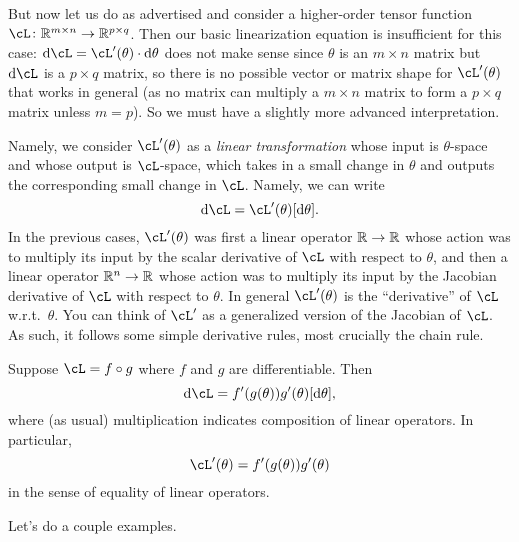 \documentclass[../../book-main.tex]{subfiles}
\begin{document}
But now let us do as advertised and consider a higher-order tensor function \(\cL \colon \R^{m \times n} \to \R^{p \times q}\). Then our basic linearization equation is insufficient for this case: \(\odif{\cL} = \cL^{\prime}(\theta) \cdot \odif{\theta}\) does not make sense since \(\theta\) is an \(m \times n\) matrix but \(\odif{\cL}\) is a \(p \times q\) matrix, so there is no possible vector or matrix shape for \(\cL^{\prime}(\theta)\) that works in general (as no matrix can multiply a \(m \times n\) matrix to form a \(p \times q\) matrix unless \(m = p\)). So we must have a slightly more advanced interpretation. 

Namely, we consider \(\cL^{\prime}(\theta)\) as a \textit{linear transformation} whose input is \(\theta\)-space and whose output is \(\cL\)-space, which takes in a small change in \(\theta\) and outputs the corresponding small change in \(\cL\). Namely, we can write 
\begin{equation}
    \odif{\cL} = \cL^{\prime}(\theta)[\odif{\theta}].
\end{equation}
In the previous cases, \(\cL^{\prime}(\theta)\) was first a linear operator \(\mathbb{R} \to \mathbb{R}\) whose action was to multiply its input by the scalar derivative of \(\cL\) with respect to \(\theta\), and then a linear operator \(\mathbb{R}^{n} \to \mathbb{R}\) whose action was to multiply its input by the Jacobian derivative of \(\cL\) with respect to \(\theta\). In general \(\cL^{\prime}(\theta)\) is the ``derivative'' of \(\cL\) w.r.t.~\(\theta\). You can think of \(\cL^{\prime}\) as a generalized version of the Jacobian of \(\cL\). As such, it follows some simple derivative rules, most crucially the chain rule.

\begin{theorem}
    Suppose \(\cL = f \circ g\) where \(f\) and \(g\) are differentiable. Then 
    \begin{equation}
        \odif{\cL} = f^{\prime}(g(\theta))g^{\prime}(\theta)[\odif{\theta}],
    \end{equation}
    where (as usual) multiplication indicates composition of linear operators. In particular,
    \begin{equation}
        \cL^{\prime}(\theta) = f^{\prime}(g(\theta))g^{\prime}(\theta)
    \end{equation}
    in the sense of equality of linear operators. 
\end{theorem}

Let's do a couple examples.
\end{document}

